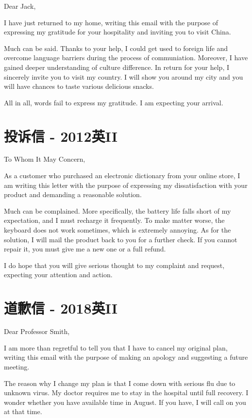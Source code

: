 \noindent Dear Jack,

I have just returned to my home, writing this email with the purpose of expressing my 
gratitude for your hospitality and inviting you to visit China.

Much can be said. Thanks to your help, I could get used to foreign life and 
overcome language barriers during the process of communiation. 
Moreover, I have gained deeper understanding of culture difference. 
In return for your help, I sincerely invite you to visit my country. 
I will show you around my city and you will have chances to taste various
delicious snacks.

All in all, words fail to express my gratitude. I am expecting your arrival.

\YSLM

\section{投诉信 - 2012英II}

\noindent To Whom It May Concern,

As a customer who purchased an electronic dictionary from your online store,
I am writing this letter with the purpose of expressing my dissatisfaction
with your product and demanding a reasonable solution.

Much can be complained. More specifically, the battery life falls short of 
my expectation, and I must recharge it frequently. To make matter worse, the
keyboard does not work sometimes, which is extremely annoying. 
As for the solution, I will mail the product back to you for a further check.
If you cannot repair it, you must give me a new one or a full refund.

I do hope that you will give serious thought to my complaint and request,
expecting your attention and action. 



\section{道歉信 - 2018英II}

\noindent Dear Professor Smith,

I am more than regretful to tell you that I have to cancel my original plan, 
writing this email with the purpose of making an apology and suggesting a future meeting.

The reason why I change my plan is that I come down with serious flu due to unknown virus.
My doctor requires me to stay in the hospital until full recovery. I wonder whether you have 
available time in August. If you have, I will call on you at that time. 

